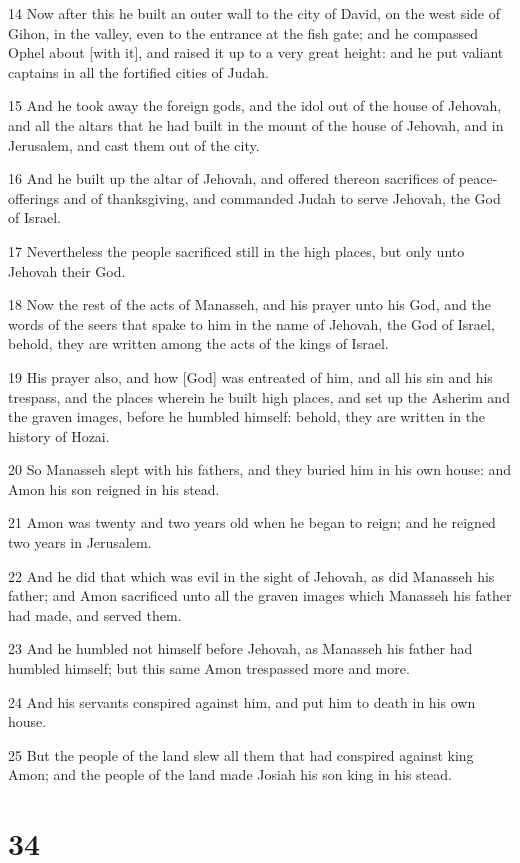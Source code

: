 \par 14 Now after this he built an outer wall to the city of David, on the west side of Gihon, in the valley, even to the entrance at the fish gate; and he compassed Ophel about [with it], and raised it up to a very great height: and he put valiant captains in all the fortified cities of Judah.
\par 15 And he took away the foreign gods, and the idol out of the house of Jehovah, and all the altars that he had built in the mount of the house of Jehovah, and in Jerusalem, and cast them out of the city.
\par 16 And he built up the altar of Jehovah, and offered thereon sacrifices of peace-offerings and of thanksgiving, and commanded Judah to serve Jehovah, the God of Israel.
\par 17 Nevertheless the people sacrificed still in the high places, but only unto Jehovah their God.
\par 18 Now the rest of the acts of Manasseh, and his prayer unto his God, and the words of the seers that spake to him in the name of Jehovah, the God of Israel, behold, they are written among the acts of the kings of Israel.
\par 19 His prayer also, and how [God] was entreated of him, and all his sin and his trespass, and the places wherein he built high places, and set up the Asherim and the graven images, before he humbled himself: behold, they are written in the history of Hozai.
\par 20 So Manasseh slept with his fathers, and they buried him in his own house: and Amon his son reigned in his stead.
\par 21 Amon was twenty and two years old when he began to reign; and he reigned two years in Jerusalem.
\par 22 And he did that which was evil in the sight of Jehovah, as did Manasseh his father; and Amon sacrificed unto all the graven images which Manasseh his father had made, and served them.
\par 23 And he humbled not himself before Jehovah, as Manasseh his father had humbled himself; but this same Amon trespassed more and more.
\par 24 And his servants conspired against him, and put him to death in his own house.
\par 25 But the people of the land slew all them that had conspired against king Amon; and the people of the land made Josiah his son king in his stead.

\chapter{34}

